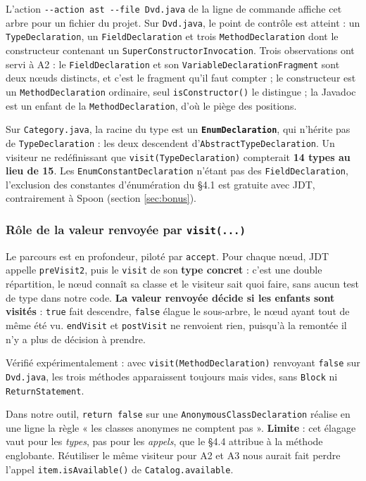\documentclass[11pt,a4paper]{article}
\begin{document}
L'action \texttt{-{}-action ast -{}-file Dvd.java} de la ligne de commande affiche cet arbre pour un fichier du projet. Sur \texttt{Dvd.java}, le point de contrôle est atteint : un \texttt{TypeDeclaration}, un \texttt{FieldDeclaration} et trois \texttt{MethodDeclaration} dont le constructeur contenant un \texttt{SuperConstructorInvocation}. Trois observations ont servi à A2 : le \texttt{FieldDeclaration} et son \texttt{VariableDeclarationFragment} sont deux n\oe{}uds distincts, et c'est le fragment qu'il faut compter ; le constructeur est un \texttt{MethodDeclaration} ordinaire, seul \texttt{isConstructor()} le distingue ; la Javadoc est un enfant de la \texttt{MethodDeclaration}, d'où le piège des positions.

Sur \texttt{Category.java}, la racine du type est un \textbf{\texttt{EnumDeclaration}}, qui n'hérite pas de \texttt{TypeDeclaration} : les deux descendent d'\texttt{AbstractTypeDeclaration}. Un visiteur ne redéfinissant que \texttt{visit(TypeDeclaration)} compterait \textbf{14 types au lieu de 15}. Les \texttt{EnumConstantDeclaration} n'étant pas des \texttt{FieldDeclaration}, l'exclusion des constantes d'énumération du §4.1 est gratuite avec JDT, contrairement à Spoon (section \ref{sec:bonus}).

\subsubsection*{Rôle de la valeur renvoyée par \texttt{visit(...)}}

Le parcours est en profondeur, piloté par \texttt{accept}. Pour chaque n\oe{}ud, JDT appelle \texttt{preVisit2}, puis le \texttt{visit} de son \textbf{type concret} : c'est une double répartition, le n\oe{}ud connaît sa classe et le visiteur sait quoi faire, sans aucun test de type dans notre code. \textbf{La valeur renvoyée décide si les enfants sont visités} : \texttt{true} fait descendre, \texttt{false} élague le sous-arbre, le n\oe{}ud ayant tout de même été vu. \texttt{endVisit} et \texttt{postVisit} ne renvoient rien, puisqu'à la remontée il n'y a plus de décision à prendre.

Vérifié expérimentalement : avec \texttt{visit(MethodDeclaration)} renvoyant \texttt{false} sur \texttt{Dvd.java}, les trois méthodes apparaissent toujours mais vides, sans \texttt{Block} ni \texttt{ReturnStatement}.

Dans notre outil, \texttt{return false} sur une \texttt{AnonymousClassDeclaration} réalise en une ligne la règle « les classes anonymes ne comptent pas ». \textbf{Limite} : cet élagage vaut pour les \textit{types}, pas pour les \textit{appels}, que le §4.4 attribue à la méthode englobante. Réutiliser le même visiteur pour A2 et A3 nous aurait fait perdre l'appel \texttt{item.isAvailable()} de \texttt{Catalog.available}.
\end{document}
